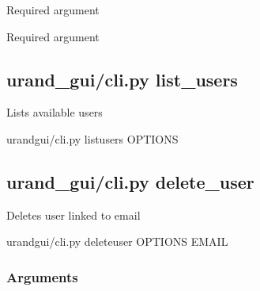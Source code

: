 \documentclass[letterpaper,10pt,english]{sphinxmanual}
\begin{document}
\begin{fulllineitems}
\label{\detokenize{cli:cmdoption-urand_gui-cli.py-add_user-arg-UNAME}}
Required argument

\end{fulllineitems}


\begin{fulllineitems}
\label{\detokenize{cli:cmdoption-urand_gui-cli.py-add_user-arg-EMAIL}}
Required argument

\end{fulllineitems}



\subsection{urand\_gui/cli.py list\_users}
\label{\detokenize{cli:urand-gui-cli-py-list-users}}
Lists available users

\begin{sphinxVerbatim}[commandchars=\\\{\}]
urand\PYGZus{}gui/cli.py list\PYGZus{}users \PYG{o}{[}OPTIONS\PYG{o}{]}
\end{sphinxVerbatim}


\subsection{urand\_gui/cli.py delete\_user}
\label{\detokenize{cli:urand-gui-cli-py-delete-user}}
Deletes user linked to email

\begin{sphinxVerbatim}[commandchars=\\\{\}]
urand\PYGZus{}gui/cli.py delete\PYGZus{}user \PYG{o}{[}OPTIONS\PYG{o}{]} EMAIL
\end{sphinxVerbatim}
\subsubsection*{Arguments}
\end{document}
